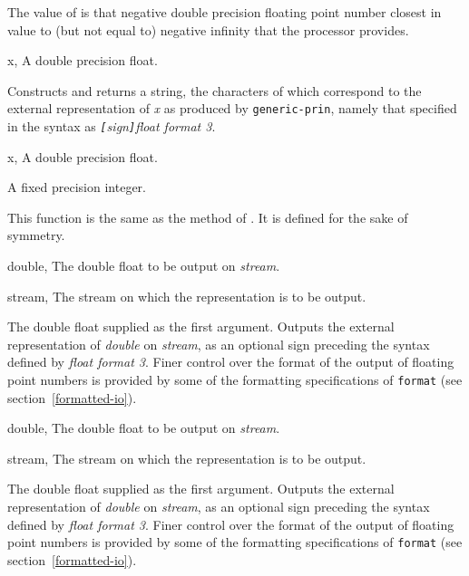 \begin{optDefinition}
%
\remarks%
The value of  is that negative double
precision floating point number closest in value to (but not equal to) negative
infinity that the processor provides.

%
\begin{specargs}
    \item[x, \classref{double-float}] A double precision float.
\end{specargs}
%
\result%
Constructs and returns a string, the characters of which correspond to the
external representation of {\em x\/} as produced by {\tt generic-prin}, namely
that specified in the syntax as {\em {\tt[}sign{\tt]}float format 3}.

%
\begin{specargs}
    \item[x, \classref{double-float}] A double precision float.
\end{specargs}
%
\result%
A fixed precision integer.

\remarks%
This function is the same as the  method of
.  It is defined for the sake of symmetry.

%
\begin{specargs}
    \item[double, \classref{double-float}]%
    The double float to be output on {\em stream}.
    \item[stream, \classref{stream}]%
    The stream on which the representation is to be output.
\end{specargs}
%
\result%
The double float supplied as the first argument.
%
\remarks%
Outputs the external representation of {\em double\/} on {\em stream}, as an
optional sign preceding the syntax defined by {\em float format 3}.  Finer
control over the format of the output of floating point numbers is provided by
some of the formatting specifications of {\tt format} (see
section~\ref{formatted-io}).

%
\begin{specargs}
    \item[double, \classref{double-float}]%
    The double float to be output on {\em stream}.
    \item[stream, \classref{stream}]%
    The stream on which the representation is to be output.
\end{specargs}
%
\result%
The double float supplied as the first argument.
%
\remarks%
Outputs the external representation of {\em double\/} on {\em stream}, as an
optional sign preceding the syntax defined by {\em float format 3}.  Finer
control over the format of the output of floating point numbers is provided by
some of the formatting specifications of {\tt format} (see
section~\ref{formatted-io}).
%
\end{optDefinition}
